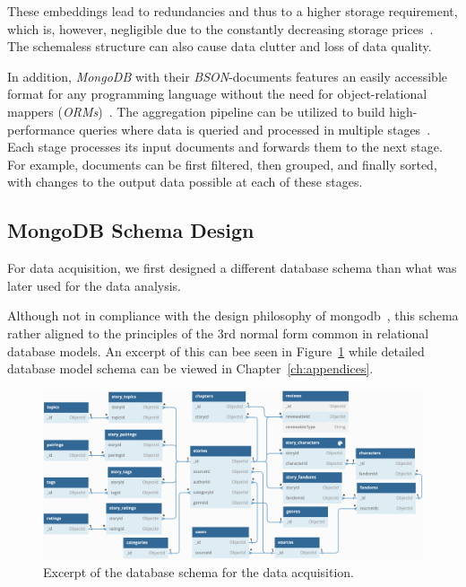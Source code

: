 These embeddings lead to redundancies and thus to a higher storage requirement, which is, however, negligible due to the constantly decreasing storage prices~\citep{McCallum2022HistoricalStorage}.
The schemaless structure can also cause data clutter and loss of data quality.

In addition, \emph{MongoDB} with their \emph{BSON}-documents features an easily accessible format for any programming language without the need for object-relational mappers (\emph{ORMs})~\citep{Bruce2021UnderstandingMongoDB}.
The aggregation pipeline can be utilized to build high-performance queries where data is queried and processed in multiple stages~\citep{MongoDBAggregationPipeline}.
Each stage processes its input documents and forwards them to the next stage.
For example, documents can be first filtered, then grouped, and finally sorted, with changes to the output data possible at each of these stages.

\subsection{MongoDB Schema Design}\label{subsec:db-schema}

For data acquisition, we first designed a different database schema than what was later used for the data analysis.

Although not in compliance with the design philosophy of mongodb~\citep{MongoDBAdvantagesMongoDB}, this schema rather aligned to the principles of the 3rd normal form common in relational database models.
An excerpt of this can bee seen in Figure~\ref{fig:fan-fiction-db-acquisition-overview} while detailed database model schema can be viewed in Chapter~\ref{ch:appendices}.


\begin{figure}[htp]
    \centering
    \includegraphics[width=\textwidth]{figures/fan_fiction_db_acquisition_overview}
    \caption[Excerpt of the database schema for the data acquisition.]{Excerpt of the database schema for the data acquisition.}
    \label{fig:fan-fiction-db-acquisition-overview}
\end{figure}

